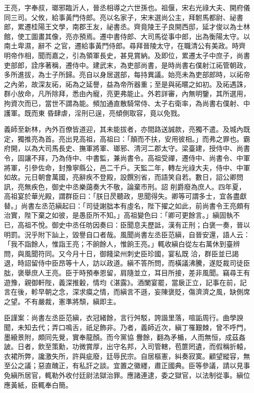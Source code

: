 
\begin{pinyinscope}

 王亮，字奉叔，瑯邪臨沂人，晉丞相導之六世孫也。祖偃，宋右光祿大夫、開府儀同三司。父攸，給事黃門侍郎。亮以名家子，宋末選尚公主，拜駙馬都尉、祕書郎，累遷桂陽王文學，南郡王友，祕書丞。齊竟陵王子良開西邸，延才俊以為士林館，使工圖畫其像，亮亦預焉。遷中書侍郎、大司馬從事中郎，出為衡陽太守。以南土卑濕，辭不
 之官，遷給事黃門侍郎。尋拜晉陵太守，在職清公有美政。時齊明帝作相，聞而嘉之，引為領軍長史，甚見賞納。及即位，累遷太子中庶子，尚書吏部郎，詮序著稱，遷侍中。建武末，為吏部尚書，是時尚書右僕射江祏管朝政，多所進拔，為士子所歸。亮自以身居選部，每持異議。始亮未為吏部郎時，以祏帝之內弟，故深友祏，祏為之延譽，益為帝所器重；至是與祏暱之如初。及祏遇誅，群小放命，凡所除拜，悉由內寵，亮更弗能止。外若詳審，內無明鑒，其所選用，拘資次而已，當世不謂為能。頻加通直散騎常侍、太子右衛率，為尚書右僕射、中護軍。既而東
 昏肆虐，淫刑已逞，亮傾側取容，竟以免戮。



 義師至新林，內外百僚皆道迎，其未能拔者，亦間路送誠款，亮獨不遣。及城內既定，獨推亮為首。亮出見高祖，高祖曰：「顛而不扶，安用彼相。」而弗之罪也。霸府開，以為大司馬長史、撫軍將軍、瑯邪、清河二郡太守。梁臺建，授侍中、尚書令，固讓不拜，乃為侍中、中書監，兼尚書令。高祖受禪，遷侍中、尚書令、中軍將軍，引參佐命，封豫寧縣公，邑二千戶。天監二年，轉左光祿大夫，侍中、中軍如故。元日朝會萬國，亮辭疾不登殿，設饌別省，而語笑自若。數日，詔公卿問訊，亮無疾色，御史中丞樂藹奏大不敬，論棄市刑。詔
 削爵廢為庶人。四年夏，高祖宴於華光殿，謂群臣曰：「朕日昃聽政，思聞得失。卿等可謂多士，宜各盡獻替。」尚書左丞范縝起曰：「司徒謝朏本有虛名，陛下擢之如此，前尚書令王亮頗有治實，陛下棄之如彼，是愚臣所不知。」高祖變色曰：「卿可更餘言。」縝固執不已，高祖不悅。御史中丞任昉因奏曰：臣聞息夫歷詆，漢有正刑；白褒一奏，晉以明罰。況乎附下訕上，毀譽自口者哉。風聞尚書左丞臣范縝，自晉安還，語人云：「我不詣餘人，惟詣王亮；不餉餘人，惟餉王亮。」輒收縝白從左右萬休到臺辨問，與風聞符同。又今月十日，御餞梁州刺史臣珍國，宴私既
 洽，群臣並已謁退，時詔留侍中臣昂等十人，訪以政道。縝不答所問，而橫議沸騰，遂貶裁司徒臣朏，褒舉庶人王亮。臣于時預奉恩留，肩隨並立，耳目所接，差非風聞。竊尋王有遊豫，親御軒陛，義深推轂，情均《湛露》。酒闌宴罷，當扆正立，記事在前，記言在後，軫早朝之念，深求瘼之情，而縝言不遜，妄陳褒貶，傷濟濟之風，缺側席之望。不有嚴裁，憲準將頹，縝即主。



 臣謹案：尚書左丞臣范縝，衣冠緒餘，言行舛駁，誇諧里落，喧詬周行。曲學諛聞，未知去代；弄口鳴舌，祇足飾非。乃者，義師近次，縝丁罹艱棘，曾不呼門，墨縗景附，頗同先覺，實奉龍顏。而今黨協
 釁餘，翻為矛楯，人而無恒，成茲姦詖。日者，飲至策勳，功微賞厚，出守名邦，入司管轄，苞篚罔遺，而假稱折轅，衣裙所弊，讒激失所，許與疵廢，廷辱民宗。自居樞憲，糾奏寂寞。顧望縱容，無至公之議；惡直醜正，有私訐之談。宜置之徽纆，肅正國典。臣等參議，請以見事免縝所居官，輒勒外收付廷尉法獄治罪。應諸連逮，委之獄官，以法制從事。縝位應黃紙，臣輒奉白簡。




\end{pinyinscope}
